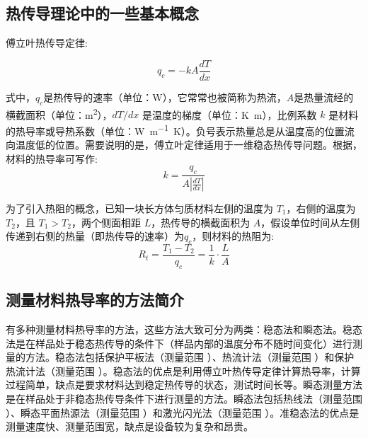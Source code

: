 \documentclass[a4paper,utf8]{article}
\begin{document}
    \subsection{热传导理论中的一些基本概念}
        傅立叶热传导定律:\par
        \begin{equation}
            q_c=-kA\frac{dT}{dx} \label{eq:1}
        \end{equation} \par
        式中，$q_c$是热传导的速率（单位：\unit{\watt}），它常常也被简称为热流，$A$是热量流经的横截面积（单位：\unit{\meter\squared}），$dT/dx$ 是温度的梯度（单位：\unit{\kelvin\metre}），比例系数 $k$ 是材料的热导率或导热系数（单位：\unit{\watt\per\meter\kelvin}）。负号表示热量总是从温度高的位置流向温度低的位置。需要说明的是，傅立叶定律适用于一维稳态热传导问题。根据，材料的热导率可写作:
        \begin{equation}
            k=\frac{q_c}{A \displaystyle \left|\frac{dT}{dx}\right|} \label{eq:2}
        \end{equation} \par
        为了引入热阻的概念，已知一块长方体匀质材料左侧的温度为 $T_1$，右侧的温度为 $T_2$，且 $T_1 > T_2$，两个侧面相距 $L$，热传导的横截面积为 $A$，假设单位时间从左侧传递到右侧的热量（即热传导的速率）为$q_c$，则材料的热阻为:
        \begin{equation}
            R_t=\frac{T_1-T_2}{q_c}=\frac{1}{k}\cdot\frac{L}{A} \label{eq:3}
        \end{equation} \par

    \subsection{测量材料热导率的方法简介}
        有多种测量材料热导率的方法，这些方法大致可分为两类：稳态法和瞬态法。稳态法是在样品处于稳态热传导的条件下（样品内部的温度分布不随时间变化）进行测量的方法。稳态法包括保护平板法（测量范围 ）、热流计法（测量范围 ）和保护热流计法（测量范围 ）。稳态法的优点是利用傅立叶热传导定律计算热导率，计算过程简单，缺点是要求材料达到稳定热传导的状态，测试时间长等。瞬态测量方法是在样品处于非稳态热传导条件下进行测量的方法。瞬态法包括热线法（测量范围 ）、瞬态平面热源法（测量范围 ）和激光闪光法（测量范围 ）。准稳态法的优点是测量速度快、测量范围宽，缺点是设备较为复杂和昂贵。
\end{document}
